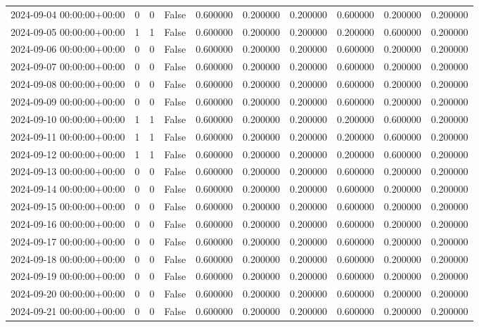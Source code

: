 \begin{tabular}{lrrrrrrrrr}
2024-09-04 00:00:00+00:00 & 0 & 0 & False & 0.600000 & 0.200000 & 0.200000 & 0.600000 & 0.200000 & 0.200000 \\
2024-09-05 00:00:00+00:00 & 1 & 1 & False & 0.600000 & 0.200000 & 0.200000 & 0.200000 & 0.600000 & 0.200000 \\
2024-09-06 00:00:00+00:00 & 0 & 0 & False & 0.600000 & 0.200000 & 0.200000 & 0.600000 & 0.200000 & 0.200000 \\
2024-09-07 00:00:00+00:00 & 0 & 0 & False & 0.600000 & 0.200000 & 0.200000 & 0.600000 & 0.200000 & 0.200000 \\
2024-09-08 00:00:00+00:00 & 0 & 0 & False & 0.600000 & 0.200000 & 0.200000 & 0.600000 & 0.200000 & 0.200000 \\
2024-09-09 00:00:00+00:00 & 0 & 0 & False & 0.600000 & 0.200000 & 0.200000 & 0.600000 & 0.200000 & 0.200000 \\
2024-09-10 00:00:00+00:00 & 1 & 1 & False & 0.600000 & 0.200000 & 0.200000 & 0.200000 & 0.600000 & 0.200000 \\
2024-09-11 00:00:00+00:00 & 1 & 1 & False & 0.600000 & 0.200000 & 0.200000 & 0.200000 & 0.600000 & 0.200000 \\
2024-09-12 00:00:00+00:00 & 1 & 1 & False & 0.600000 & 0.200000 & 0.200000 & 0.200000 & 0.600000 & 0.200000 \\
2024-09-13 00:00:00+00:00 & 0 & 0 & False & 0.600000 & 0.200000 & 0.200000 & 0.600000 & 0.200000 & 0.200000 \\
2024-09-14 00:00:00+00:00 & 0 & 0 & False & 0.600000 & 0.200000 & 0.200000 & 0.600000 & 0.200000 & 0.200000 \\
2024-09-15 00:00:00+00:00 & 0 & 0 & False & 0.600000 & 0.200000 & 0.200000 & 0.600000 & 0.200000 & 0.200000 \\
2024-09-16 00:00:00+00:00 & 0 & 0 & False & 0.600000 & 0.200000 & 0.200000 & 0.600000 & 0.200000 & 0.200000 \\
2024-09-17 00:00:00+00:00 & 0 & 0 & False & 0.600000 & 0.200000 & 0.200000 & 0.600000 & 0.200000 & 0.200000 \\
2024-09-18 00:00:00+00:00 & 0 & 0 & False & 0.600000 & 0.200000 & 0.200000 & 0.600000 & 0.200000 & 0.200000 \\
2024-09-19 00:00:00+00:00 & 0 & 0 & False & 0.600000 & 0.200000 & 0.200000 & 0.600000 & 0.200000 & 0.200000 \\
2024-09-20 00:00:00+00:00 & 0 & 0 & False & 0.600000 & 0.200000 & 0.200000 & 0.600000 & 0.200000 & 0.200000 \\
2024-09-21 00:00:00+00:00 & 0 & 0 & False & 0.600000 & 0.200000 & 0.200000 & 0.600000 & 0.200000 & 0.200000 \\

\end{tabular}
